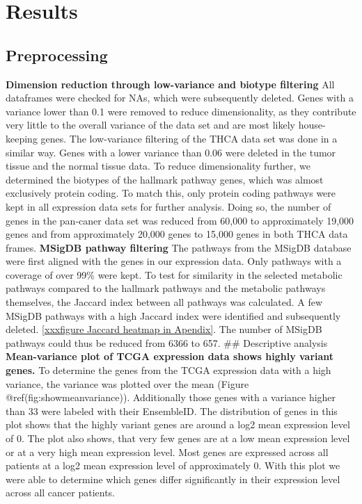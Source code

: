 \documentclass[
]{article}
\author{}
\date{\vspace{-2.5em}}
\begin{document}
\hypertarget{results}{%
\section{Results}\label{results}}

\hypertarget{preprocessing}{%
\subsection{Preprocessing}\label{preprocessing}}

\textbf{Dimension reduction through low-variance and biotype filtering}
All dataframes were checked for NAs, which were subsequently deleted.
Genes with a variance lower than 0.1 were removed to reduce
dimensionality, as they contribute very little to the overall variance
of the data set and are most likely house-keeping genes. The
low-variance filtering of the THCA data set was done in a similar way.
Genes with a lower variance than 0.06 were deleted in the tumor tissue
and the normal tissue data. To reduce dimensionality further, we
determined the biotypes of the hallmark pathway genes, which was almost
exclusively protein coding. To match this, only protein coding pathways
were kept in all expression data sets for further analysis. Doing so,
the number of genes in the pan-caner data set was reduced from 60,000 to
approximately 19,000 genes and from approximately 20,000 genes to 15,000
genes in both THCA data frames. \textbf{MSigDB pathway filtering} The
pathways from the MSigDB database were first aligned with the genes in
our expression data. Only pathways with a coverage of over 99\% were
kept. To test for similarity in the selected metabolic pathways compared
to the hallmark pathways and the metabolic pathways themselves, the
Jaccard index between all pathways was calculated. A few MSigDB pathways
with a high Jaccard index were identified and subsequently deleted.
\ref{xxxfigure Jaccard heatmap in Apendix}. The number of MSigDB
pathways could thus be reduced from 6366 to 657. \#\# Descriptive
analysis \textbf{Mean-variance plot of TCGA expression data shows highly
variant genes.} To determine the genes from the TCGA expression data
with a high variance, the variance was plotted over the mean (Figure
@ref(fig:showmeanvariance)). Additionally those genes with a variance
higher than 33 were labeled with their EnsembleID. The distribution of
genes in this plot shows that the highly variant genes are around a log2
mean expression level of 0. The plot also shows, that very few genes are
at a low mean expression level or at a very high mean expression level.
Most genes are expressed across all patients at a log2 mean expression
level of approximately 0. With this plot we were able to determine which
genes differ significantly in their expression level across all cancer
patients.
\end{document}
